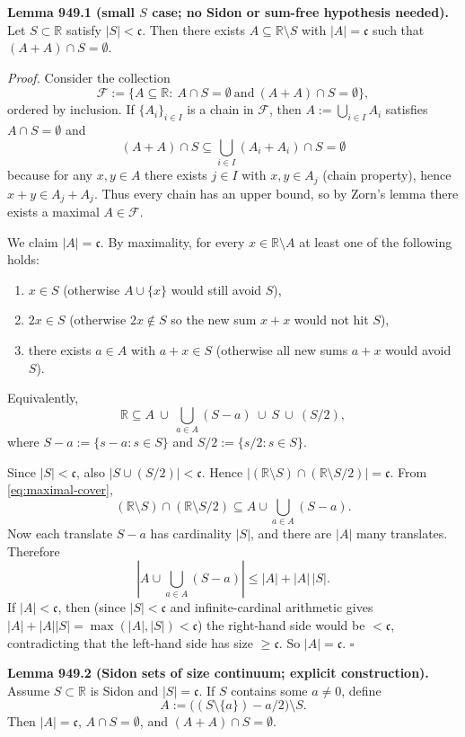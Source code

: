 \medskip
\noindent\textbf{Lemma 949.1 (small $S$ case; no Sidon or sum-free hypothesis needed).}
Let $S\subset\mathbb R$ satisfy $|S|<\mathfrak c$. Then there exists $A\subseteq\mathbb R\setminus S$ with $|A|=\mathfrak c$ such that $(A+A)\cap S=\emptyset$.

\medskip
\noindent\emph{Proof.}
Consider the collection
\[
\mathcal F:=\{A\subseteq\mathbb R:\ A\cap S=\emptyset\ \text{and}\ (A+A)\cap S=\emptyset\},
\]
ordered by inclusion.
If $\{A_i\}_{i\in I}$ is a chain in $\mathcal F$, then $A:=\bigcup_{i\in I}A_i$ satisfies $A\cap S=\emptyset$ and
\[
(A+A)\cap S\subseteq \bigcup_{i\in I}(A_i+A_i)\cap S=\emptyset
\]
because for any $x,y\in A$ there exists $j\in I$ with $x,y\in A_j$ (chain property), hence $x+y\in A_j+A_j$.
Thus every chain has an upper bound, so by Zorn's lemma there exists a maximal $A\in\mathcal F$.

We claim $|A|=\mathfrak c$.
By maximality, for every $x\in\mathbb R\setminus A$ at least one of the following holds:
\begin{enumerate}
\item $x\in S$ (otherwise $A\cup\{x\}$ would still avoid $S$),
\item $2x\in S$ (otherwise $2x\notin S$ so the new sum $x+x$ would not hit $S$),
\item there exists $a\in A$ with $a+x\in S$ (otherwise all new sums $a+x$ would avoid $S$).
\end{enumerate}
Equivalently,
\begin{equation}\label{eq:maximal-cover}
\mathbb R\subseteq A\ \cup\ \bigcup_{a\in A}(S-a)\ \cup\ S\ \cup\ (S/2),
\end{equation}
where $S-a:=\{s-a:s\in S\}$ and $S/2:=\{s/2:s\in S\}$.

Since $|S|<\mathfrak c$, also $|S\cup (S/2)|<\mathfrak c$.
Hence $|(\mathbb R\setminus S)\cap (\mathbb R\setminus S/2)|=\mathfrak c$.
From \eqref{eq:maximal-cover},
\[
(\mathbb R\setminus S)\cap (\mathbb R\setminus S/2)\subseteq A\cup \bigcup_{a\in A}(S-a).
\]
Now each translate $S-a$ has cardinality $|S|$, and there are $|A|$ many translates. Therefore
\[
\left|A\cup \bigcup_{a\in A}(S-a)\right|\le |A|+|A|\,|S|.
\]
If $|A|<\mathfrak c$, then (since $|S|<\mathfrak c$ and infinite-cardinal arithmetic gives $|A|+|A||S|=\max(|A|,|S|)<\mathfrak c$) the right-hand side would be $<\mathfrak c$, contradicting that the left-hand side has size $\ge \mathfrak c$.
So $|A|=\mathfrak c$.
\hfill $\square$

\medskip
\noindent\textbf{Lemma 949.2 (Sidon sets of size continuum; explicit construction).}
Assume $S\subset\mathbb R$ is Sidon and $|S|=\mathfrak c$. If $S$ contains some $a\ne 0$, define
\[
A:=\bigl((S\setminus\{a\})-a/2\bigr)\setminus S.
\]
Then $|A|=\mathfrak c$, $A\cap S=\emptyset$, and $(A+A)\cap S=\emptyset$.

